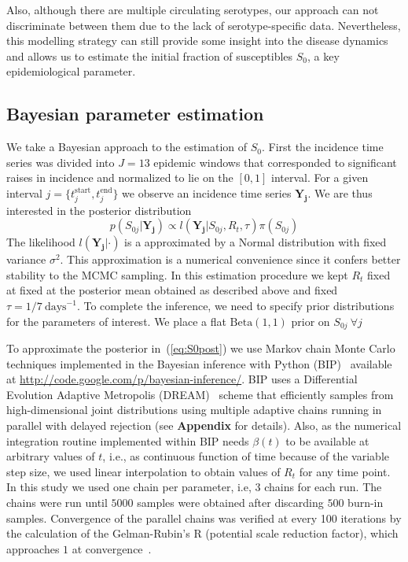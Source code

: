 \documentclass[10pt]{article}
\begin{document}
Also, although there are multiple circulating serotypes, our approach
can not discriminate between them due to the lack of serotype-specific data.
Nevertheless, this modelling strategy can still provide some insight into the 
disease dynamics and allows us to estimate the initial fraction of susceptibles 
$S_0$, a key epidemiological parameter.

\subsection*{Bayesian parameter estimation}

We take a Bayesian approach to the estimation of $S_0$.
First the incidence time series was divided into $J=13$ 
epidemic windows that corresponded to significant raises in incidence and 
normalized to lie on the $[0,1]$ interval.
For a given interval $j = \{ t_j^{\text{start}}, t_j^{\text{end}} \} $ we 
observe an incidence time series $\mathbf{Y_{j}}$.
We are thus interested in the posterior distribution
\begin{equation}
 \label{eq:S0post}
 p(S_{0j}|\mathbf{Y_{j}}) \propto l(\mathbf{Y_{j}}|S_{0j}, R_t, \tau 
)\pi(S_{0j}) 
\end{equation}
The likelihood $l(\mathbf{Y_{j}}|\cdot)$ is a approximated by a Normal 
distribution with fixed variance $\sigma^2$. This approximation is a numerical 
convenience since it confers better stability to the MCMC sampling.
In this estimation procedure we kept $R_t$ fixed at fixed at the posterior mean 
obtained as described above and fixed $\tau = 1/7\: \text{days}^{-1}$.
To complete the inference, we need to specify prior distributions for the 
parameters of interest.
We place a flat $\text{Beta}(1, 1)$ prior on $S_{0j}\:\forall j$

To approximate the posterior in~(\ref{eq:S0post}) we use Markov chain Monte 
Carlo techniques implemented in the Bayesian inference with Python 
(BIP)~\citep{pone2011} available at  
\url{http://code.google.com/p/bayesian-inference/}.
BIP uses a Differential Evolution Adaptive Metropolis (DREAM)~\citep{vrugt2008} 
scheme that efficiently samples from high-dimensional joint distributions using 
multiple adaptive chains running in parallel with delayed rejection (see 
\textbf{Appendix} for details).
Also, as the numerical integration routine implemented within BIP needs 
$\beta(t)$ to be available at 
arbitrary values of $t$, i.e., as continuous function of time because of the 
variable step size, we used linear interpolation to obtain values of $R_t$ for 
any time point.
In this study we used one chain per parameter, i.e, 3 chains for each run.
The chains were run until $5000$ samples were obtained after discarding $500$ 
burn-in samples.
Convergence of the parallel chains was verified at every 100 iterations by the 
calculation of the Gelman-Rubin's R (potential scale 
reduction factor), which approaches $1$ at convergence~\citep{brooks1998}.
\end{document}
